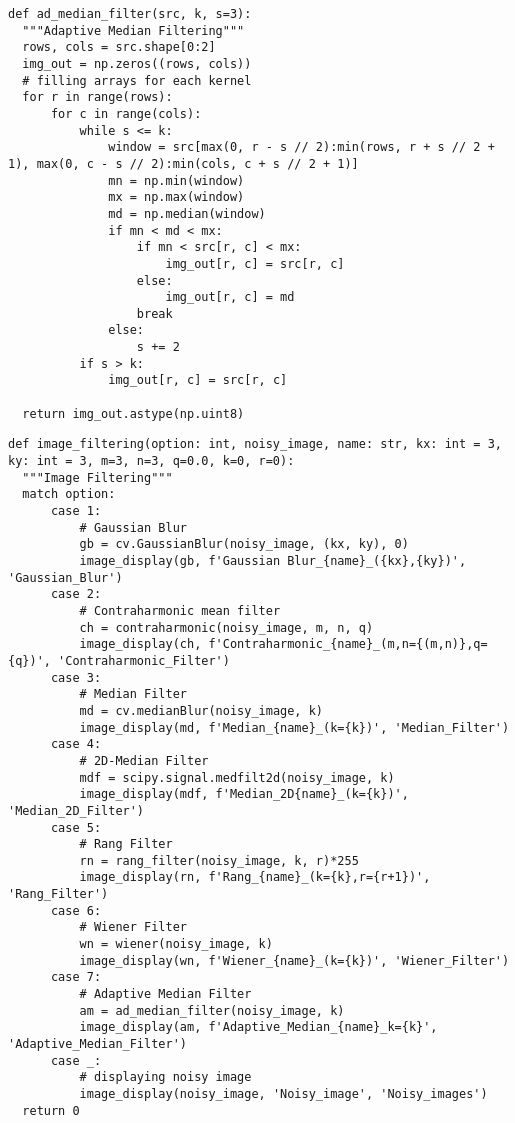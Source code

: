 \documentclass[a4paper, 12pt]{extarticle}
\begin{document}
\begin{lstlisting}[style=python_white]
def ad_median_filter(src, k, s=3):
  """Adaptive Median Filtering"""
  rows, cols = src.shape[0:2]
  img_out = np.zeros((rows, cols))
  # filling arrays for each kernel
  for r in range(rows):
      for c in range(cols):
          while s <= k:
              window = src[max(0, r - s // 2):min(rows, r + s // 2 + 1), max(0, c - s // 2):min(cols, c + s // 2 + 1)]
              mn = np.min(window)
              mx = np.max(window)
              md = np.median(window)
              if mn < md < mx:
                  if mn < src[r, c] < mx:
                      img_out[r, c] = src[r, c]
                  else:
                      img_out[r, c] = md
                  break
              else:
                  s += 2
          if s > k:
              img_out[r, c] = src[r, c]

  return img_out.astype(np.uint8)
\end{lstlisting}

\begin{lstlisting}[style=python_white]
def image_filtering(option: int, noisy_image, name: str, kx: int = 3, ky: int = 3, m=3, n=3, q=0.0, k=0, r=0):
  """Image Filtering"""
  match option:
      case 1:
          # Gaussian Blur
          gb = cv.GaussianBlur(noisy_image, (kx, ky), 0)
          image_display(gb, f'Gaussian Blur_{name}_({kx},{ky})', 'Gaussian_Blur')
      case 2:
          # Contraharmonic mean filter
          ch = contraharmonic(noisy_image, m, n, q)
          image_display(ch, f'Contraharmonic_{name}_(m,n={(m,n)},q={q})', 'Contraharmonic_Filter')
      case 3:
          # Median Filter
          md = cv.medianBlur(noisy_image, k)
          image_display(md, f'Median_{name}_(k={k})', 'Median_Filter')
      case 4:
          # 2D-Median Filter
          mdf = scipy.signal.medfilt2d(noisy_image, k)
          image_display(mdf, f'Median_2D{name}_(k={k})', 'Median_2D_Filter')
      case 5:
          # Rang Filter
          rn = rang_filter(noisy_image, k, r)*255
          image_display(rn, f'Rang_{name}_(k={k},r={r+1})', 'Rang_Filter')
      case 6:
          # Wiener Filter
          wn = wiener(noisy_image, k)
          image_display(wn, f'Wiener_{name}_(k={k})', 'Wiener_Filter')
      case 7:
          # Adaptive Median Filter
          am = ad_median_filter(noisy_image, k)
          image_display(am, f'Adaptive_Median_{name}_k={k}', 'Adaptive_Median_Filter')
      case _:
          # displaying noisy image
          image_display(noisy_image, 'Noisy_image', 'Noisy_images')
  return 0
\end{lstlisting}
\end{document}
